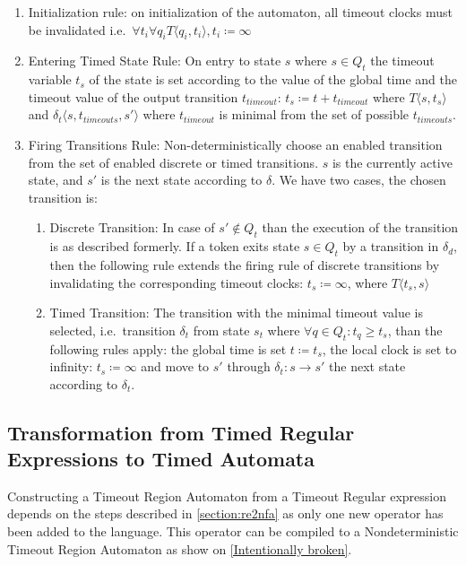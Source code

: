 			\begin{enumerate}
				\item Initialization rule: on initialization of the automaton, all timeout clocks must be invalidated 
				i.e.~$\forall t_i \forall q_i T \langle q_i, t_i \rangle, t_i \coloneqq \infty $
				
				\item Entering Timed State Rule: On entry to state $s$ where $s \in Q_t$ the timeout variable $t_s$ of the state is set according to the value of the global time and the timeout value of the output transition $t_{\textit{timeout}}$:
					$t_s\coloneqq t+t_{\textit{timeout}}$
					where $T\langle s,t_s \rangle$ and $\delta_t\langle s,t_{\textit{timeouts}},s' \rangle$ where $t_{\textit{timeout}}$ is minimal from the set of possible $t_{\textit{timeouts}}$.
				
				\item Firing Transitions Rule: Non-deterministically choose an enabled transition from the set of enabled discrete or timed transitions. 
					$s$ is the currently active state, and $s'$ is the next state according to $\delta$.
					We have two cases, the chosen transition is:
					\begin{enumerate}
						\item Discrete Transition: In case of $s' \notin Q_t$ than the execution of the transition is as described formerly. 
						If a token exits state $s \in Q_t$ by a transition in $\delta_d$, 
						then the following rule extends the firing rule of discrete transitions by invalidating the corresponding timeout clocks:
							$t_s \coloneqq \infty$, where $T \langle t_s, s \rangle$
						\item Timed Transition: The transition with the minimal timeout value is selected, 
							i.e.~transition $\delta_t$ from state $s_t$ where $\forall q \in Q_t: t_q \geq t_s$, than the following rules apply:
							the global time is set $t \coloneqq t_s$, the local clock is set to infinity: 
							$t_s \coloneqq \infty$ and move to $s'$ through $\delta_t : s \rightarrow s'$ the next state according to $\delta_t$.
					\end{enumerate}			
			\end{enumerate}

	\subsection{Transformation from Timed Regular Expressions to Timed Automata}
		\label{section:tre2tnfa}	
		Constructing a Timeout Region Automaton from a Timeout Regular expression depends on the steps described in \cref{section:re2nfa} as only one new operator has been added to the language.
		This operator can be compiled to a Nondeterministic Timeout Region Automaton as show on \cref{Intentionally broken}. 
		
